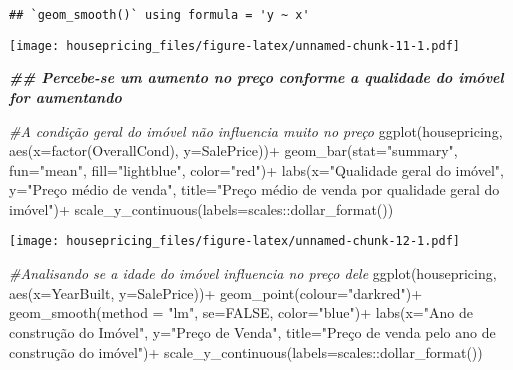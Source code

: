 \documentclass[
]{article}
\newenvironment{Shaded}{\begin{snugshade}}{\end{snugshade}}
\newcommand{\AttributeTok}[1]{\textcolor[rgb]{0.77,0.63,0.00}{#1}}
\newcommand{\CommentTok}[1]{\textcolor[rgb]{0.56,0.35,0.01}{\textit{#1}}}
\newcommand{\ConstantTok}[1]{\textcolor[rgb]{0.00,0.00,0.00}{#1}}
\newcommand{\DocumentationTok}[1]{\textcolor[rgb]{0.56,0.35,0.01}{\textbf{\textit{#1}}}}
\newcommand{\FunctionTok}[1]{\textcolor[rgb]{0.00,0.00,0.00}{#1}}
\newcommand{\NormalTok}[1]{#1}
\newcommand{\SpecialCharTok}[1]{\textcolor[rgb]{0.00,0.00,0.00}{#1}}
\newcommand{\StringTok}[1]{\textcolor[rgb]{0.31,0.60,0.02}{#1}}
\begin{document}
\begin{verbatim}
## `geom_smooth()` using formula = 'y ~ x'
\end{verbatim}

\texttt{[image: housepricing\_files/figure-latex/unnamed-chunk-11-1.pdf]}

\begin{Shaded}
\begin{Highlighting}[]
\DocumentationTok{\#\# Percebe{-}se um aumento no preço conforme a qualidade do imóvel for aumentando}
\end{Highlighting}
\end{Shaded}

\begin{Shaded}
\begin{Highlighting}[]
\CommentTok{\#A condição geral do imóvel não influencia muito no preço}
\FunctionTok{ggplot}\NormalTok{(housepricing, }\FunctionTok{aes}\NormalTok{(}\AttributeTok{x=}\FunctionTok{factor}\NormalTok{(OverallCond), }\AttributeTok{y=}\NormalTok{SalePrice))}\SpecialCharTok{+}
  \FunctionTok{geom\_bar}\NormalTok{(}\AttributeTok{stat=}\StringTok{"summary"}\NormalTok{, }\AttributeTok{fun=}\StringTok{"mean"}\NormalTok{, }\AttributeTok{fill=}\StringTok{"lightblue"}\NormalTok{, }\AttributeTok{color=}\StringTok{"red"}\NormalTok{)}\SpecialCharTok{+}
  \FunctionTok{labs}\NormalTok{(}\AttributeTok{x=}\StringTok{"Qualidade geral do imóvel"}\NormalTok{, }\AttributeTok{y=}\StringTok{"Preço médio de venda"}\NormalTok{, }\AttributeTok{title=}\StringTok{"Preço médio de venda por qualidade geral do imóvel"}\NormalTok{)}\SpecialCharTok{+}
  \FunctionTok{scale\_y\_continuous}\NormalTok{(}\AttributeTok{labels=}\NormalTok{scales}\SpecialCharTok{::}\FunctionTok{dollar\_format}\NormalTok{())}
\end{Highlighting}
\end{Shaded}

\texttt{[image: housepricing\_files/figure-latex/unnamed-chunk-12-1.pdf]}

\begin{Shaded}
\begin{Highlighting}[]
\CommentTok{\#Analisando se a idade do imóvel influencia no preço dele}
\FunctionTok{ggplot}\NormalTok{(housepricing, }\FunctionTok{aes}\NormalTok{(}\AttributeTok{x=}\NormalTok{YearBuilt, }\AttributeTok{y=}\NormalTok{SalePrice))}\SpecialCharTok{+}
  \FunctionTok{geom\_point}\NormalTok{(}\AttributeTok{colour=}\StringTok{"darkred"}\NormalTok{)}\SpecialCharTok{+}
  \FunctionTok{geom\_smooth}\NormalTok{(}\AttributeTok{method =} \StringTok{"lm"}\NormalTok{, }\AttributeTok{se=}\ConstantTok{FALSE}\NormalTok{, }\AttributeTok{color=}\StringTok{"blue"}\NormalTok{)}\SpecialCharTok{+}
  \FunctionTok{labs}\NormalTok{(}\AttributeTok{x=}\StringTok{"Ano de construção do Imóvel"}\NormalTok{, }\AttributeTok{y=}\StringTok{"Preço de Venda"}\NormalTok{, }\AttributeTok{title=}\StringTok{"Preço de venda pelo ano de construção do imóvel"}\NormalTok{)}\SpecialCharTok{+}
  \FunctionTok{scale\_y\_continuous}\NormalTok{(}\AttributeTok{labels=}\NormalTok{scales}\SpecialCharTok{::}\FunctionTok{dollar\_format}\NormalTok{())}
\end{Highlighting}
\end{Shaded}
\end{document}
